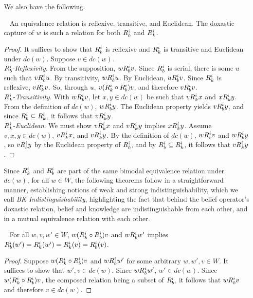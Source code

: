 We also have the following.

\begin{theorem}~\label{dc_equiv}
	An equivalence relation is reflexive, transitive, and Euclidean. The doxastic capture of $w$ is such a relation for both $R_{b}^i$ and $R_{k}^i$.
\end{theorem}
\begin{proof}
	It suffices to show that $R_{b}^i$ is reflexive and $R_{k}^i$ is transitive and Euclidean under $dc(w)$. Suppose $v\in dc(w)$.\\ 
	$R_{b}^i$-\emph{Reflexivity}. From the supposition, $wR_{b}^iv$. Since $R_{b}^i$ is serial, there is some $u$ such that $vR_{b}^iu$. By transitivity, $wR_{b}^iu$. By Euclidean, $uR_{b}^iv$. Since $R_{k}^i$ is reflexive, $vR_{k}^iv$. So, through $u$, $v(R_{k}^i \circ R_{b}^i)v$, and therefore $vR_{b}^iv$.\\
	$R_{k}^i$-\emph{Transitivity}. With $wR_{b}^iv$, let $x,y \in dc(w)$ be such that $vR_{k}^ix$ and $xR_{k}^iy$. From the definition of $dc(w)$, $wR_{b}^iy$. The Euclidean property yields $vR_{b}^iy$, and since $R_{b}^i\subseteq R_{k}^i$, it follows that $vR_{k}^iy$.\\
	$R_{k}^i$-\emph{Euclidean}. We must show $vR_{k}^ix$ and $vR_{k}^iy$ implies $xR_{k}^iy$. Assume $v,x,y \in dc(w)$, $vR_{k}^ix$, and $vR_{k}^iy$. By the definition of $dc(w)$, $wR_{b}^iv$ and $wR_{b}^iy$, so $vR_{b}^iy$ by the Euclidean property of $R_{b}^i$, and by $R_{b}^i \subseteq R_{k}^i$, it follows that $vR_{k}^iy$.
\end{proof}

Since $R_{k}^i$ and $R_{b}^i$ are part of the same bimodal equivalence relation under $dc(w)$, for all $w\in W$, the following theorems follow in a straightforward manner, establishing notions of weak and strong indistinguishability, which we call \emph{BK Indistinguishability}, highlighting the fact that behind the belief operator's doxastic relation, belief and knowledge are indistinguishable from each other, and in a mutual equivalence relation with each other.

\begin{theorem}~\label{weak_equiv}
	For all $w,v,w' \in W$, $w(R_{k}^i \circ R_{b}^i)v$ and $wR_{b}^iw'$ implies $R_{b}^i(w') = R_{k}^i(w') = R_{k}^i(v) = R_{b}^i(v)$.
\end{theorem}
\begin{proof}
	Suppose $w(R_{k}^i \circ R_{b}^i)v$ and $wR_{b}^iw'$ for some arbitrary $w,w',v\in W$. It suffices to show that $w',v \in dc(w)$. Since $wR_{b}^iw'$, $w'\in dc(w)$. Since $w(R_{k}^i \circ R_{b}^i)v$, the composed relation being a subset of $R_{b}^i$, it follows that $wR_{b}^iv$ and therefore $v \in dc(w)$.
\end{proof}

